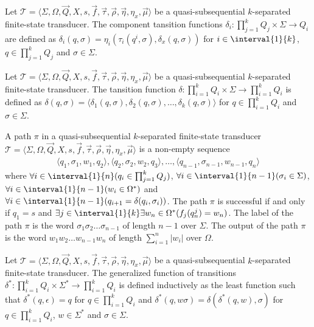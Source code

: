 \begin{definition}
	Let $\mathcal{T} = \langle \Sigma, \Omega, \vec{Q}, X, s, \vec{f},
	\vec{\tau}, \vec{\rho}, \vec{\eta}, \eta_x, \vec{\mu} \rangle$ be a
	quasi-subsequential $k$-separated finite-state transducer. The component
	tansition functions $\delta_i : \prod_{j=1}^k{Q_j} \times \Sigma
	\rightarrow Q_i$ are defined as $\delta_i(q, \sigma) =
	\eta_i(\tau_i(q^i, \sigma), \delta_x(q, \sigma))$ for $i \in
	\interval{1}{k}$, $q \in \prod_{j=1}^k{Q_j}$ and $\sigma \in \Sigma$.
\end{definition}

\begin{definition}
	Let $\mathcal{T} = \langle \Sigma, \Omega, \vec{Q}, X, s, \vec{f},
	\vec{\tau}, \vec{\rho}, \vec{\eta}, \eta_x, \vec{\mu} \rangle$ be a
	quasi-subsequential $k$-separated finite-state transducer. The tansition
	function $\delta : \prod_{i=1}^k{Q_i} \times \Sigma \rightarrow
	\prod_{i=1}^k{Q_i}$ is defined as $\delta(q, \sigma) = \langle \delta_1(q,
	\sigma), \delta_2(q, \sigma), \ldots, \delta_k(q, \sigma) \rangle$ for $q
	\in \prod_{i=1}^k{Q_i}$ and $\sigma \in \Sigma$.
\end{definition}

\begin{definition}
	A path $\pi$ in a quasi-subsequential $k$-separated finite-state
	transducer $\mathcal{T} = \langle \Sigma, \Omega, \vec{Q}, X, s, \vec{f},
	\vec{\tau}, \vec{\rho}, \vec{\eta}, \eta_x, \vec{\mu} \rangle$ is a
	non-empty sequence
	\begin{align*}
		\langle q_1, \sigma_1, w_1, q_2 \rangle, \langle q_2, \sigma_2,
		w_2, q_3 \rangle, \ldots, \langle q_{n-1}, \sigma_{n-1}, w_{n-1},
		q_n \rangle
	\end{align*}
	where $\forall i \in \interval{1}{n}(q_i \in
	\prod_{j=1}^k{Q_j})$, $\forall i \in \interval{1}{n-1} (\sigma_i \in
	\Sigma)$, $\forall i \in \interval{1}{n-1} (w_i \in \Omega^*)$ and $\forall
	i \in \interval{1}{n-1} (q_{i+1} = \delta(q_i, \sigma_i))$. The path $\pi$
	is successful if and only if $q_1 = s$ and $\exists j \in \interval{1}{k}
	\exists w_n \in \Omega^*(f_j(q_n^j) = w_n)$. The label of the path $\pi$ is
	the word $\sigma_1\sigma_2\ldots\sigma_{n-1}$ of length $n-1$ over $\Sigma$.
	The output of the path $\pi$ is the word $w_1 w_2 \ldots w_{n-1} w_n$ of
	length $\sum_{i=1}^{n}{|w_i|}$ over $\Omega$.
\end{definition}

\begin{definition}
	Let $\mathcal{T} = \langle \Sigma, \Omega, \vec{Q}, X, s, \vec{f},
	\vec{\tau}, \vec{\rho}, \vec{\eta}, \eta_x, \vec{\mu} \rangle$
	be a quasi-subsequential $k$-separated finite-state transducer. The
	generalized function of transitions $\delta^* : \prod_{i=1}^k{Q_i}
	\times \Sigma^* \rightarrow \prod_{i=1}^k{Q_i}$ is defined inductively as
	the least function such that $\delta^*(q, \epsilon) = q$ for $q \in
	\prod_{i=1}^k{Q_i}$ and $\delta^*(q, w\sigma) = \delta(\delta^*(q, w),
	\sigma)$ for $q \in \prod_{i=1}^k{Q_i}$, $w \in \Sigma^*$ and $\sigma \in
	\Sigma$.
\end{definition}


